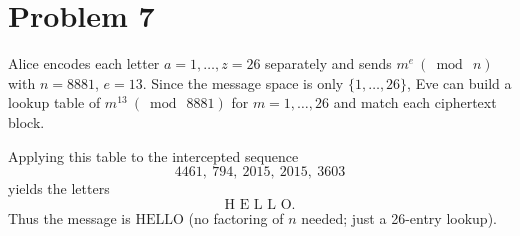 \section*{Problem 7}

Alice encodes each letter $a=1,\ldots,z=26$ separately and sends $m^e \ (\bmod\ n)$ with
$n=8881$, $e=13$. Since the message space is only $\{1,\ldots,26\}$, Eve can build a
lookup table of $m^{13}\ (\bmod\ 8881)$ for $m=1,\ldots,26$ and match each ciphertext block.

Applying this table to the intercepted sequence
\[
4461,\ 794,\ 2015,\ 2015,\ 3603
\]
yields the letters
\[
\boxed{\text{H E L L O}}.
\]
Thus the message is \(\boxed{\text{HELLO}}\) (no factoring of $n$ needed; just a 26-entry lookup).
